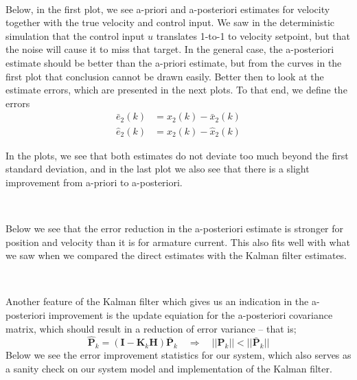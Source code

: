 \documentclass[11pt]{article}
\begin{document}
    \begin{center}
    \end{center}
    { \hspace*{\fill} \\}
    
    Below, in the first plot, we see a-priori and a-posteriori estimates for
velocity together with the true velocity and control input. We saw in
the deterministic simulation that the control input \(u\) translates
1-to-1 to velocity setpoint, but that the noise will cause it to miss
that target. In the general case, the a-posteriori estimate should be
better than the a-priori estimate, but from the curves in the first plot
that conclusion cannot be drawn easily. Better then to look at the
estimate errors, which are presented in the next plots. To that end, we
define the errors \[
\begin{aligned}
\bar{e}_2(k) &= x_2(k) - \bar{x}_2(k) \\
\hat{e}_2(k) &= x_2(k) - \hat{x}_2(k)
\end{aligned}
\]

In the plots, we see that both estimates do not deviate too much beyond
the first standard deviation, and in the last plot we also see that
there is a slight improvement from a-priori to a-posteriori.


    \begin{center}
    \end{center}
    { \hspace*{\fill} \\}
    
    Below we see that the error reduction in the a-posteriori estimate is
stronger for position and velocity than it is for armature current. This
also fits well with what we saw when we compared the direct estimates
with the Kalman filter estimates.


    \begin{center}
    \end{center}
    { \hspace*{\fill} \\}
    
    Another feature of the Kalman filter which gives us an indication in the
a-posteriori improvement is the update equiation for the a-posteriori
covariance matrix, which should result in a reduction of error variance
-- that is; \[
\hat{\mathbf{P}}_k = (\mathbf{I} - \mathbf{K}_k \mathbf{H}) \bar{\mathbf{P}}_k \quad \Rightarrow \quad || \hat{\mathbf{P}}_k || < || \bar{\mathbf{P}}_k ||
\] Below we see the error improvement statistics for our system, which
also serves as a sanity check on our system model and implementation of
the Kalman filter.
\end{document}
